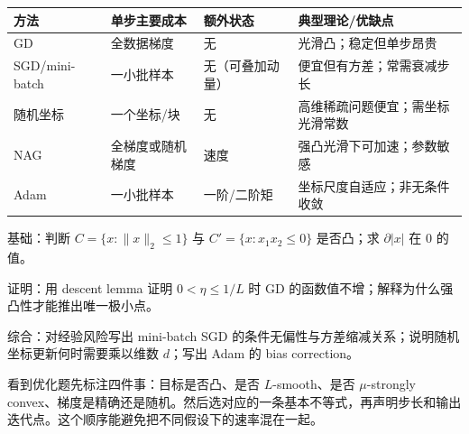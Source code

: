 \documentclass[11pt]{ctexart}
\begin{document}
\begin{center}
\small
\begin{tabular}{p{2.4cm}p{2.7cm}p{2.6cm}p{3.4cm}}
\toprule
方法 & 单步主要成本 & 额外状态 & 典型理论/优缺点\\
\midrule
GD & 全数据梯度 & 无 & 光滑凸；稳定但单步昂贵\\
SGD/mini-batch & 一小批样本 & 无（可叠加动量） & 便宜但有方差；常需衰减步长\\
随机坐标 & 一个坐标/块 & 无 & 高维稀疏问题便宜；需坐标光滑常数\\
NAG & 全梯度或随机梯度 & 速度 & 强凸光滑下可加速；参数敏感\\
Adam & 一小批样本 & 一阶/二阶矩 & 坐标尺度自适应；非无条件收敛\\
\bottomrule
\end{tabular}
\end{center}

\begin{examproblem}[分层自测]
基础：判断 \(C=\{x:\|x\|_2\le1\}\) 与 \(C'=\{x:x_1x_2\le0\}\) 是否凸；求 \(\partial |x|\) 在 \(0\) 的值。

证明：用 descent lemma 证明 \(0<\eta\le1/L\) 时 GD 的函数值不增；解释为什么强凸性才能推出唯一极小点。

综合：对经验风险写出 mini-batch SGD 的条件无偏性与方差缩减关系；说明随机坐标更新何时需要乘以维数 \(d\)；写出 Adam 的 bias correction。
\end{examproblem}

\begin{remark}[最后的答题清单]
看到优化题先标注四件事：目标是否凸、是否 \(L\)-smooth、是否 \(\mu\)-strongly convex、梯度是精确还是随机。然后选对应的一条基本不等式，再声明步长和输出迭代点。这个顺序能避免把不同假设下的速率混在一起。
\end{remark}

\printbibliography[heading=bibintoc,title={参考文献与官方来源}]
\end{document}
